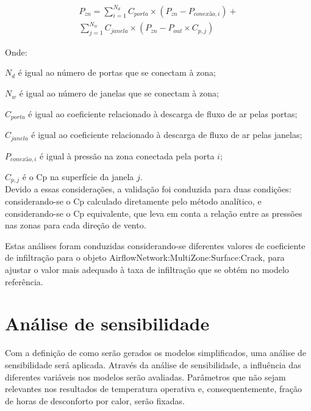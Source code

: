\documentclass[brazil,hardcopy,openany,a5paper]{ufscthesis}
\begin{document}
		 \begin{equation}\label{eq:P}
		 \begin{split}
		 P_{zn} = \sum_{i=1}^{N_d}{C_{porta}\times(P_{zn} - P_{conexão,i})} + \\ %
		 \sum_{j=1}^{N_w}{C_{janela}\times(P_{zn} - P_{out}\times C_{p,j})}
		 \end{split}
		 \end{equation}
		
		Onde:
		
		$N_d$ é igual ao número de portas que se conectam à zona;
		
		$N_w$ é igual ao número de janelas que se conectam à zona;
		
		$C_{porta}$ é igual ao coeficiente relacionado à descarga de fluxo de ar pelas portas;
		
		$C_{janela}$ é igual ao coeficiente relacionado à descarga de fluxo de ar pelas janelas;
		
		$P_{conexão,i}$ é igual à pressão na zona conectada pela porta $i$;
		
		$C_{p,j}$ é o Cp na superfície da janela $j$.
		\\
		
		Devido a essas considerações, a validação foi conduzida para duas condições: considerando-se o Cp calculado diretamente pelo método analítico, e considerando-se o Cp equivalente, que leva em conta a relação entre as pressões nas zonas para cada direção de vento.
		
		Estas análises foram conduzidas considerando-se diferentes valores de coeficiente de infiltração para o objeto AirflowNetwork:MultiZone:Surface:Crack, para ajustar o valor mais adequado à taxa de infiltração que se obtém no modelo referência.
		
		
		\section{Análise de sensibilidade}
		
		Com a definição de como serão gerados os modelos simplificados, uma análise de sensibilidade será aplicada. Através da análise de sensibilidade, a influência das diferentes variáveis nos modelos serão avaliadas. Parâmetros que não sejam relevantes nos resultados de temperatura operativa e, consequentemente, fração de horas de desconforto por calor, serão fixadas.
		
\end{document}
